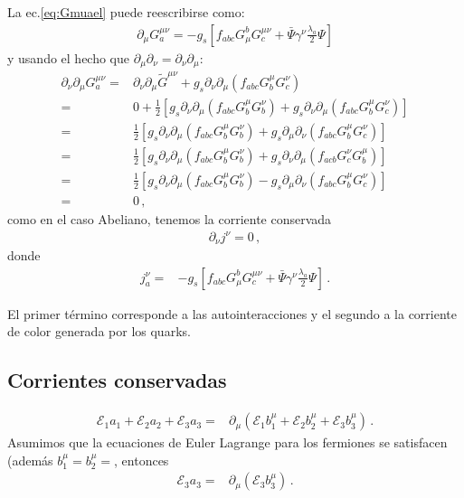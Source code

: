 La ec.\eqref{eq:Gmuael} puede reescribirse como:
\begin{align}
  \partial_\mu G^{\mu\nu}_a=-g_s\left[f_{abc}G^b_\mu G^{\mu\nu}_c+\bar{\Psi}\gamma^\nu\frac{\lambda_a}{2}\Psi  \right]
\end{align}
y usando el hecho que $\partial_\mu\partial_\nu=\partial_\nu\partial_\mu$:
\begin{align}
  \partial_\nu\partial_\mu G^{\mu\nu}_a=&\partial_\nu\partial_\mu\widetilde{G}^{\mu\nu}+g_s\partial_\nu\partial_\mu\left(f_{abc}G^\mu_bG^\nu_c\right)\nonumber\\
=&0+\frac{1}{2}\left[g_s\partial_\nu\partial_\mu\left(f_{abc}G^\mu_bG^\nu_b\right)+g_s\partial_\nu\partial_\mu\left(f_{abc}G^\mu_bG^\nu_c\right)\right]\nonumber\\
=&\frac{1}{2}\left[g_s\partial_\nu\partial_\mu\left(f_{abc}G^\mu_bG^\nu_b\right)+g_s\partial_\mu\partial_\nu\left(f_{abc}G^\mu_bG^\nu_c\right)\right]\nonumber\\
=&\frac{1}{2}\left[g_s\partial_\nu\partial_\mu\left(f_{abc}G^\mu_bG^\nu_b\right)+g_s\partial_\nu\partial_\mu\left(f_{acb}G^\nu_cG^\mu_b\right)\right]\nonumber\\
=&\frac{1}{2}\left[g_s\partial_\nu\partial_\mu\left(f_{abc}G^\mu_bG^\nu_b\right)-g_s\partial_\mu\partial_\nu\left(f_{abc}G^\mu_bG^\nu_c\right)\right]\nonumber\\
=&0\,,
\end{align}
como en el caso Abeliano, tenemos la corriente conservada
\begin{align}
  \partial_\nu j^\nu=0\,,
\end{align}
donde
\begin{align}
\label{eq:jnuqcd}
  j^\nu_a=&-g_s\left[f_{abc}G^b_\mu G^{\mu\nu}_c+\bar{\Psi}\gamma^\nu\frac{\lambda_a}{2}\Psi  \right]\,.
\end{align}

El primer término corresponde a las autointeracciones y el segundo a la corriente de color generada por los quarks.

\subsection{Corrientes conservadas}

\begin{align}
  \mathcal{E}_1 a_1 + \mathcal{E}_2 a_2 + \mathcal{E}_3 a_3=& \partial_{\mu} \left( \mathcal{E}_1 b_1^{\mu} + \mathcal{E}_2 b_2^{\mu} + \mathcal{E}_3 b_3^{\mu}   \right) \,.
\end{align}
Asumimos que la ecuaciones de Euler Lagrange para los fermiones se satisfacen (además $b_1^{\mu}=b_2^{\mu}=$, entonces
\begin{align}
   \mathcal{E}_3 a_3=& \partial_{\mu} \left(  \mathcal{E}_3 b_3^{\mu}   \right) \,.
\end{align}

